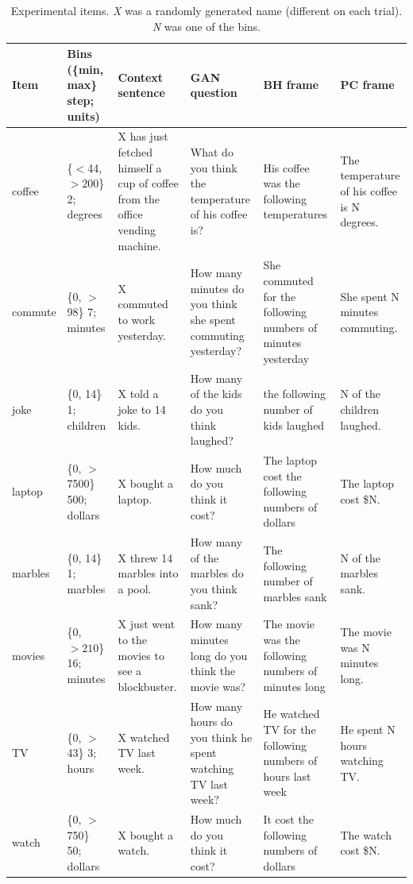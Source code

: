 \documentclass[10pt,letterpaper]{article}
\begin{document}
\begin{table}
  \footnotesize
  \centering
  \begin{tabular}{l p{2.2cm} p{2.5cm} p{3.5cm} p{3cm} p{2.5cm}}
	\toprule
	\textbf{Item} & \textbf{Bins} (\{min, max\} step; units)& \textbf{Context sentence} & \textbf{GAN question} & \textbf{BH frame} & \textbf{PC frame} \\
	\midrule
    coffee &  \{$<$44, $>$200\} 2; degrees  & X has just fetched himself a cup of coffee from the office vending machine. & What do you think the temperature of his coffee is?  & His coffee was the following temperatures & The temperature of his coffee is N degrees.\\
    	\midrule
	commute &  \{0, $>$98\} 7; minutes & X commuted to work yesterday. & How many minutes do you think she spent commuting yesterday? & She commuted for the following numbers of minutes yesterday & She spent N minutes commuting.\\
		\midrule
	joke &  \{0, 14\} 1; children  & X told a joke to 14 kids. & How many of the kids do you think laughed? & the following number of kids laughed & N of the children laughed.\\
    	\midrule
	laptop &  \{0, $>$7500\} 500; dollars& X bought a laptop. & How much do you think it cost? & The laptop cost the following numbers of dollars & The laptop cost \$N.\\
	\midrule
    marbles &  \{0, 14\} 1; marbles & X threw 14 marbles into a pool. & How many of the marbles do you think sank? & The following number of marbles sank & N of the marbles sank.\\
	\midrule
	movies &  \{0, $>210$\} 16; minutes& X just went to the movies to see a blockbuster. & How many minutes long do you think the movie was? & The movie was the following numbers of minutes long & The movie was N minutes long.\\
	\midrule
	TV &  \{0, $>$43\} 3; hours & X watched TV last week. & How many hours do you think he spent watching TV last week? & He watched TV for the following numbers of hours last week & He spent N hours watching TV.\\
	\midrule
	watch &  \{0, $>$750\} 50; dollars& X bought a watch.& How much do you think it cost? & It cost the following numbers of dollars & The watch cost \$N.\\
    \bottomrule
  \end{tabular}
  \caption{Experimental items. \emph{X} was a randomly generated name (different on each trial). \emph{N} was one of the bins.}
  \label{tab:Items}
\end{table}
\end{document}
